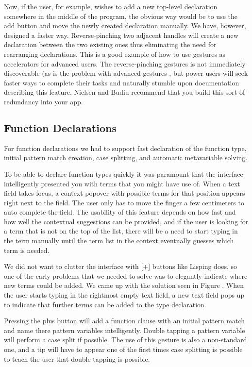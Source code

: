 Now, if the user, for example, wishes to add a new top-level declaration somewhere in the middle of the program, the obvious way would be to use the add button and move the newly created declaration manually. We have, however, designed a faster way. Reverse-pinching two adjacent handles will create a new
declaration between the two existing ones thus eliminating the  need for rearranging declarations. This is a good example of how to use gestures as accelerators for advanced users.
The reverse-pinching gestures is not immediately discoverable (as is the
problem with advanced gestures \cite[p 141]{nielsen2013mobile}, but power-users will seek faster
ways to complete their tasks and naturally stumble upon documentation
describing this feature. Nielsen and Budiu \cite[p 143]{nielsen2013mobile} recommend
that you build this sort of redundancy into your app.

\subsection{Function Declarations}
For function declarations we had to support fast declaration of the function
type, initial pattern match creation, case splitting, and automatic
metavariable solving.

To be able to declare function types quickly it was paramount that the
interface intelligently presented you with terms that you might have use of.
When a text field takes focus, a context popover with possible terms for that position
appears right next to the field. The user only has to move the finger a few
centimeters to auto complete the field. The usability of this feature depends
on how fast and how well the contextual suggestions can be provided, and if the
user is looking for a term that is not on the top of the list, there will be a
need to start typing in the term manually until the term list in the context
eventually guesses which term is needed.

We did not want to clutter the interface with [+] buttons like Lisping does, so
one of the early problems that we needed to solve was to elegantly indicate
where new terms could be added. We came up with the solution seen in Figure
. When the user starts typing in the rightmost empty text field,
a new text field pops up to indicate that further terms can be added to the
type declaration.

\missingfigure{}

Pressing the plus button will add a function clause with an initial pattern
match and name there pattern variables intelligently. Double tapping a pattern
variable will perform a case split if possible. The use of this gesture is also
a non-standard one, and a tip will have to appear one of the first times case
splitting is possible to teach the user that double tapping is possible.

